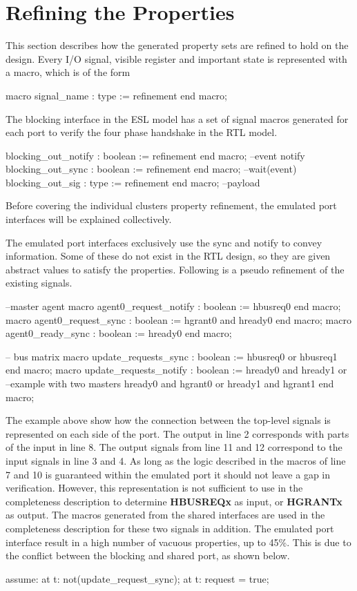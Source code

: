 \section{Refining the Properties}
\label{sec:refine}
This section describes how the generated property sets are refined to hold on the design. Every I/O signal, visible register and important state is represented with a macro, which is of the form 
\begin{VHI}
macro signal_name : type := refinement end macro;
\end{VHI}

The blocking interface in the ESL model has a set of signal macros generated for each port to verify the four phase handshake in the RTL model.
\begin{VHI}
blocking_out_notify : boolean := refinement end macro; --event notify
blocking_out_sync : boolean := refinement end macro;   --wait(event)
blocking_out_sig : type := refinement end macro;       --payload
\end{VHI}


Before covering the individual clusters property refinement, the emulated port interfaces will be explained collectively. \par
{} 

The emulated port interfaces exclusively use the sync and notify to convey information. Some of these do not exist in the RTL design, so they are given abstract values to satisfy the properties. Following is a pseudo refinement of the existing signals.
\begin{VHI}
--master agent
macro agent0_request_notify : boolean := hbusreq0 end macro;
macro agent0_request_sync : boolean := hgrant0 and hready0 end macro;
macro agent0_ready_sync : boolean := hready0 end macro;

-- bus matrix
macro update_requests_sync : boolean := 
 hbusreq0 or hbusreq1 
end macro;
macro update_requests_notify : boolean :=
 hready0 and hready1 or --example with two masters
 hready0 and hgrant0 or
 hready1 and hgrant1
end macro;
\end{VHI}

The example above show how the connection between the top-level signals is represented on each side of the port. The output in line 2 corresponds with parts of the input in line 8. The output signals from line 11 and 12 correspond to the input signals in line 3 and 4. As long as the logic described in the macros of line 7 and 10 is guaranteed within the emulated port it should not leave a gap in verification. However, this representation is not sufficient to use in the completeness description to determine \textbf{HBUSREQx} as input, or \textbf{HGRANTx} as output. The macros generated from the shared interfaces are used in the completeness description for these two signals in addition. The emulated port interface result in a high number of vacuous properties, up to 45\%. This is due to the conflict between the blocking and shared port, as shown below.
\begin{VHI}
assume:
 at t: not(update_request_sync);
 at t: request  = true;
\end{VHI}

